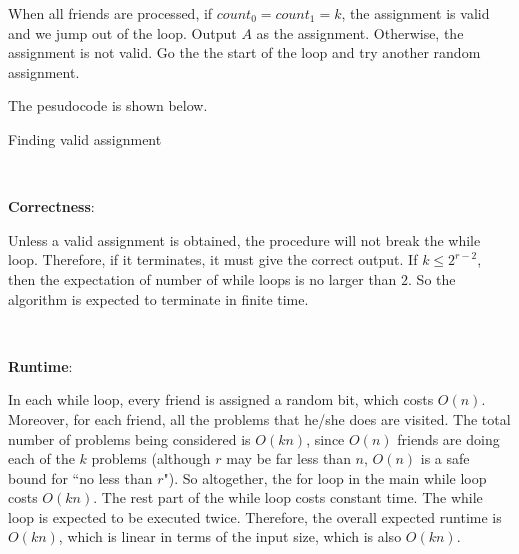\documentclass{article}
\begin{document}
When all friends are processed, if $count_0=count_1=k$, the assignment is valid and we jump out of the loop. Output $A$ as the assignment. Otherwise, the assignment is not valid. Go the the start of the loop and try another random assignment.

The pesudocode is shown below.
\begin{algorithm}
\caption{Finding valid assignment}
\begin{algorithmic}[1]
				\EndIf
			\EndFor
		\Else{}
				\EndIf
			\EndFor
		\EndIf
	\EndFor
	\EndIf
\EndWhile
{}
\EndProcedure
\end{algorithmic}
\end{algorithm}

~

\noindent\textbf{Correctness}:

Unless a valid assignment is obtained, the procedure will not break the while loop. Therefore, if it terminates, it must give the correct output. If $k\leqslant 2^{r-2}$, then the expectation of number of while loops is no larger than $2$. So the algorithm is expected to terminate in finite time.

~

\noindent\textbf{Runtime}:

In each while loop, every friend is assigned a random bit, which costs $O(n)$. Moreover, for each friend, all the problems that he/she does are visited. The total number of problems being considered is $O(kn)$, since $O(n)$ friends are doing each of the $k$ problems (although $r$ may be far less than $n$, $O(n)$ is a safe bound for ``no less than $r$"). So altogether, the for loop in the main while loop costs $O(kn)$. The rest part of the while loop costs constant time. The while loop is expected to be executed twice. Therefore, the overall expected runtime is $O(kn)$, which is linear in terms of the input size, which is also $O(kn)$.
\end{document}
